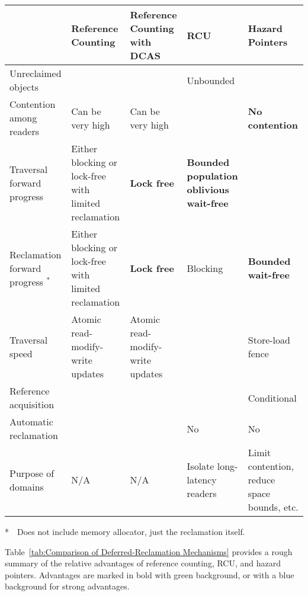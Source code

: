 \documentclass[letterpaper,twocolumn,10pt]{article}
\begin{document}
\begin{table*}
\small
\centering
\begin{tabular}{p{1.2in}|p{1.2in}|p{1.2in}|p{1.2in}|p{1.2in}}
	& Reference Counting
		& \raggedright Reference Counting with DCAS
			& RCU
				& Hazard Pointers \\
	\hline
	\hline
	Unreclaimed objects
		& \cellcolor{green!30}{\bf Bounded}
			& \cellcolor{green!30}{\bf Bounded}
				& Unbounded
					& \cellcolor{green!30}{\bf Bounded} \\
	\hline
	\raggedright
	Contention among readers
		& Can be very high
			& Can be very high
				& \cellcolor{green!30}{\bf No contention}
					& \cellcolor{green!30}
					  {\bf No contention} \\
	\hline
	\raggedright
	Traversal forward progress
		& Either blocking or lock-free with limited reclamation
			& \cellcolor{green!30} {\bf Lock free}
				& \cellcolor{blue!20}
				  {\bf Bounded population oblivious wait-free}
					& \cellcolor{green!30}{\bf Lock-free} \\
	\hline
	\raggedright
	Reclamation forward progress $^*$
		& Either blocking or lock-free with limited reclamation
			& \cellcolor{green!30} {\bf Lock free}
				& Blocking
					& \cellcolor{blue!20}
					  {\bf Bounded wait-free} \\
	\hline
	Traversal speed
		& Atomic read-modify-write updates
			& Atomic read-modify-write updates
				& \cellcolor{green!30}{\bf No or low overhead}
					& Store-load fence \\
	\hline
	Reference acquisition
		& \cellcolor{green!30}{\bf Unconditional}
			& \cellcolor{green!30}{\bf Unconditional}
				& \cellcolor{green!30}{\bf Unconditional}
					& Conditional \\
	\hline
	\raggedright
	Automatic reclamation
		& \cellcolor{green!30}{\bf Yes}
			& \cellcolor{green!30}{\bf Yes}
				& No
					& No \\
	\hline
	Purpose of domains
		& N/A
			& N/A
				& Isolate long-latency readers
					& Limit contention, reduce space
					  bounds, etc.  \\
\end{tabular}
\caption{Comparison of Deferred-Reclamation Mechanisms}
\label{tab:Comparison of Deferred-Reclamation Mechanisms}

\flushleft
\noindent
*~~Does not include memory allocator, just the reclamation itself.
\end{table*}

Table~\ref{tab:Comparison of Deferred-Reclamation Mechanisms}
provides a rough summary of the relative advantages of reference
counting, RCU, and hazard pointers.
Advantages are marked in bold with green background, or with a blue
background for strong advantages.
\end{document}
